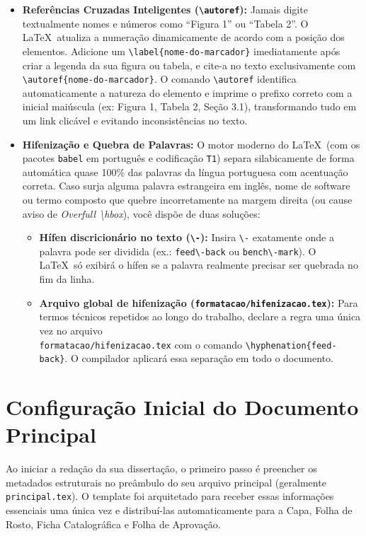 \documentclass[12pt, a4paper]{article}
\begin{document}
\begin{itemize}
    \item \textbf{Referências Cruzadas Inteligentes (\texttt{\textbackslash autoref}):} Jamais digite textualmente nomes e números como ``Figura 1'' ou ``Tabela 2''. O \LaTeX \ atualiza a numeração dinamicamente de acordo com a posição dos elementos. Adicione um \texttt{\textbackslash label\{nome-do-marcador\}} imediatamente após criar a legenda da sua figura ou tabela, e cite-a no texto exclusivamente com \\ \texttt{\textbackslash autoref\{nome-do-marcador\}}. O comando \texttt{\textbackslash autoref} identifica automaticamente a natureza do elemento e imprime o prefixo correto com a inicial maiúscula (ex: Figura 1, Tabela 2, Seção 3.1), transformando tudo em um link clicável e evitando inconsistências no texto.
    \item \textbf{Hifenização e Quebra de Palavras:} O motor moderno do \LaTeX \ (com os pacotes \texttt{babel} em português e codificação \texttt{T1}) separa silabicamente de forma automática quase 100\% das palavras da língua portuguesa com acentuação correta. Caso surja alguma palavra estrangeira em inglês, nome de software ou termo composto que quebre incorretamente na margem direita (ou cause aviso de \textit{Overfull \textbackslash hbox}), você dispõe de duas soluções:
    \begin{itemize}
        \item \textbf{Hífen discricionário no texto (\texttt{\textbackslash-}):} Insira \texttt{\textbackslash-} exatamente onde a palavra pode ser dividida (ex.: \texttt{feed\textbackslash-back} ou \texttt{bench\textbackslash-mark}). O \LaTeX \ só exibirá o hífen se a palavra realmente precisar ser quebrada no fim da linha.
        \item \textbf{Arquivo global de hifenização (\texttt{formatacao/hifenizacao.tex}):} Para termos técnicos repetidos ao longo do trabalho, declare a regra uma única vez no arquivo \\ \texttt{formatacao/hifenizacao.tex} com o comando \texttt{\textbackslash hyphenation\{feed-back\}}. O compilador aplicará essa separação em todo o documento.
    \end{itemize}
\end{itemize}

\section{Configuração Inicial do Documento Principal}

Ao iniciar a redação da sua dissertação, o primeiro passo é preencher os metadados estruturais no preâmbulo do seu arquivo principal (geralmente \texttt{principal.tex}). O template foi arquitetado para receber essas informações essenciais uma única vez e distribuí-las automaticamente para a Capa, Folha de Rosto, Ficha Catalográfica e Folha de Aprovação.
\end{document}
